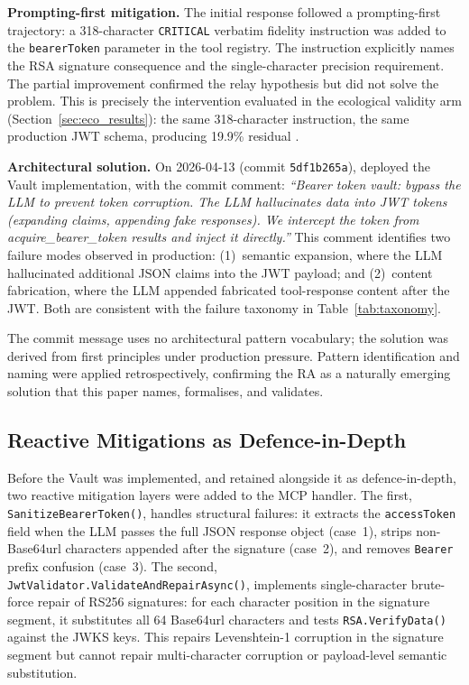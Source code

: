 \textbf{Prompting-first mitigation.}
The initial response followed a prompting-first trajectory: a 318-character
\texttt{CRITICAL} verbatim fidelity instruction was added to the
\texttt{bearerToken} parameter in the tool registry. The instruction explicitly
names the RSA signature consequence and the single-character precision
requirement.
The partial improvement confirmed the relay hypothesis but did not solve the
problem. This is precisely the intervention evaluated in the ecological
validity arm (Section~\ref{sec:eco_results}): the same 318-character
instruction, the same production JWT schema, producing 19.9\% residual \DFR{}.

\textbf{Architectural solution.}
On 2026-04-13 (commit \texttt{5df1b265a}),
deployed the Vault implementation, with the commit comment: \emph{``Bearer token
vault: bypass the LLM to prevent token corruption. The LLM hallucinates data
into JWT tokens (expanding claims, appending fake responses). We intercept the
token from acquire\_bearer\_token results and inject it directly.''}
This comment identifies two failure modes observed in production:
(1)~semantic expansion, where the LLM hallucinated additional JSON claims
into the JWT payload; and (2)~content fabrication, where the LLM appended
fabricated tool-response content after the JWT. Both are consistent with the
failure taxonomy in Table~\ref{tab:taxonomy}.

The commit message uses no architectural pattern vocabulary; the solution was
derived from first principles under production pressure. Pattern identification
and naming were applied retrospectively, confirming the RA as a naturally
emerging solution that this paper names, formalises, and validates.

\subsection{Reactive Mitigations as Defence-in-Depth}\label{sec:reactive}

Before the Vault was implemented, and retained alongside it as defence-in-depth,
two reactive mitigation layers were added to the MCP handler. The first,
\texttt{SanitizeBearerToken()}, handles structural failures: it extracts the
\texttt{accessToken} field when the LLM passes the full JSON response object
(case~1), strips non-Base64url characters appended after the signature
(case~2), and removes \texttt{Bearer} prefix confusion (case~3). The second,
\texttt{JwtValidator.ValidateAndRepairAsync()}, implements single-character
brute-force repair of RS256 signatures: for each character position in the
signature segment, it substitutes all 64 Base64url characters and tests
\texttt{RSA.VerifyData()} against the JWKS keys. This repairs Levenshtein-1
corruption in the signature segment but cannot repair multi-character corruption
or payload-level semantic substitution.

